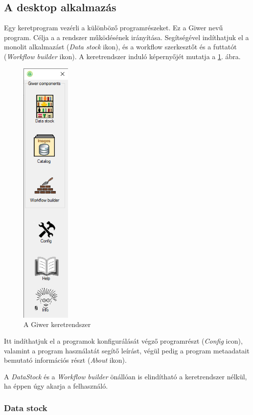 \documentclass[a4paper,12pt]{article}
\begin{document}
\subsection{A desktop alkalmazás}

Egy keretprogram vezérli a különböző programrészeket. Ez a Giwer nevű program. Célja a a rendszer működésének irányítása. Segítségével indíthatjuk el a monolit alkalmazást (\textit{Data stock} ikon), és a workflow szerkesztőt és a futtatót (\textit{Workflow builder} ikon). A keretrendszer induló képernyőjét mutatja a \ref{fig:giwerStart}. ábra.

\begin{figure}[h]
	\centering
	\includegraphics[height=13.5cm]{giwerMain.png}
	\caption{A Giwer keretrendszer}
	\label{fig:giwerStart}
\end{figure}

Itt indíthatjuk el a programok konfigurálását végző programrészt (\textit{Config} icon), valamint a program használatát segítő leírást, végül pedig a program metaadatait bemutató információs részt (\textit{About} ikon).

A \textit{DataStock} és a \textit{Workflow builder} önállóan is elindítható a keretrendszer nélkül, ha éppen úgy akarja a felhasználó.


\subsubsection{Data stock}
\end{document}
